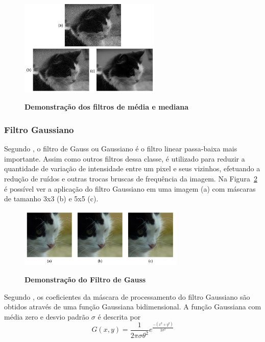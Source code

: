\documentclass[12pt,oneside,a4paper,english,french,spanish,brazil,]{abntex2}
\begin{document}
\begin{figure}[ht]
\centering
\caption{\textbf{ Demonstração dos filtros de média e mediana}}
\includegraphics[width=0.6\textwidth]{imagens/PDI_Media_Mediana.pdf}
\sourceAuthor
\label{fig:PDI_Media_Mediana}
\end{figure}

\subsubsection{Filtro Gaussiano}

Segundo \citet{conci:2003}, o filtro de Gauss ou Gaussiano é o filtro linear passa-baixa mais importante. Assim como outros filtros dessa classe, é utilizado para reduzir a quantidade de variação de intensidade entre um pixel e seus vizinhos, efetuando a redução de ruídos e outras trocas bruscas de frequência da imagem. Na Figura~\ref{fig:PDI_Gauss} é possível ver a aplicação do filtro Gaussiano em uma imagem (a) com máscaras de tamanho 3x3 (b) e 5x5 (c).

\begin{figure}[ht]
\centering
\caption{\textbf{Demonstração do Filtro de Gauss}}
\includegraphics[width=0.7\textwidth]{imagens/PDI_Gauss.pdf}
\sourceAuthor
\label{fig:PDI_Gauss}
\end{figure}

Segundo \citet{pedrini:2008}, os coeficientes da máscara de processamento do filtro Gaussiano são obtidos através de uma função Gaussiana bidimensional. A função Gaussiana com média zero e desvio padrão \(\sigma\) é descrita por \[G(x,y)=\frac{1}{2\pi\sigma\theta^2} e^{\frac{-(x^2+y^2)}{2\sigma^2}  }\]
\end{document}
